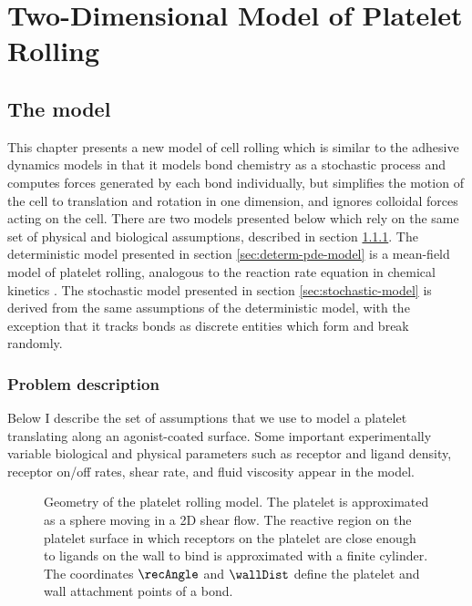 
\chapter{Two-Dimensional Model of Platelet Rolling}
\label{cha:two-dimens-roll}

\section{The model}
\label{sec:model}

This chapter presents a new model of cell rolling which is similar to
the adhesive dynamics models in that it models bond chemistry as a
stochastic process and computes forces generated by each bond
individually, but simplifies the motion of the cell to translation and
rotation in one dimension, and ignores colloidal forces acting on the
cell. There are two models presented below which rely on the same set
of physical and biological assumptions, described in section
\ref{sec:problem-description}. The deterministic model presented in
section \ref{sec:determ-pde-model} is a mean-field model of platelet
rolling, analogous to the reaction rate equation in chemical kinetics
\cite{Gillespie2007}. The stochastic model presented in section
\ref{sec:stochastic-model} is derived from the same assumptions of the
deterministic model, with the exception that it tracks bonds as
discrete entities which form and break randomly.

\subsection{Problem description}
\label{sec:problem-description}

Below I describe the set of assumptions that we use to model a
platelet translating along an agonist-coated surface. Some important
experimentally variable biological and physical parameters such as
receptor and ligand density, receptor on/off rates, shear rate, and
fluid viscosity appear in the model.

\begin{figure}
  \centering
  
  \caption[Geometry of the platelet rolling model]{Geometry of the
    platelet rolling model. The platelet is approximated as a sphere
    moving in a 2D shear flow. The reactive region on the platelet
    surface in which receptors on the platelet are close enough to
    ligands on the wall to bind is approximated with a finite
    cylinder. The coordinates $\recAngle$ and $\wallDist$ define the
    platelet and wall attachment points of a bond.}
  \label{fig:model-geometry}
\end{figure}

